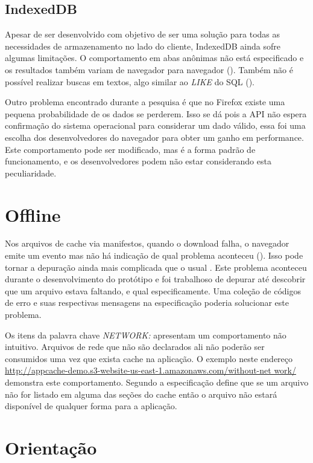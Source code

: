 \subsection{IndexedDB}

Apesar de ser desenvolvido com objetivo de ser uma solução para
todas as necessidades de armazenamento no lado do cliente, IndexedDB ainda
sofre algumas limitações. O comportamento em abas anônimas não
está especificado e os resultados também variam de navegador para
navegador (). Também não é
possível realizar buscas em textos, algo similar ao \textit{LIKE} do
SQL ().

Outro problema encontrado durante a pesquisa é que no Firefox existe
uma pequena probabilidade de os dados se perderem. Isso se dá pois a
API não espera confirmação do sistema operacional para considerar um
dado válido, essa foi uma escolha dos desenvolvedores do navegador para
obter um ganho em performance. Este comportamento pode ser modificado,
mas é a forma padrão de funcionamento, e os desenvolvedores podem não
estar considerando esta peculiaridade.

\section{Offline}

Nos arquivos de cache via manifestos, quando o download falha, o
navegador emite um evento mas não há indicação de qual problema
aconteceu (). Isso pode tornar a
depuração ainda mais complicada que o usual \autocite{diveIntohtml}.
Este problema aconteceu durante o desenvolvimento do protótipo e foi
trabalhoso de depurar até descobrir que um arquivo estava faltando,
e qual especificamente. Uma coleção de códigos de erro e suas
respectivas mensagens na especificação poderia solucionar este
problema.

Os itens da palavra chave \textit{NETWORK:} apresentam um
comportamento não intuitivo. Arquivos de rede que não
são declarados ali não poderão ser consumidos uma vez
que exista cache na aplicação. O exemplo neste endereço
\url{http://appcache-demo.s3-website-us-east-1.amazonaws.com/without-net
work/} demonstra este comportamento. Segundo \citet{gameAssetManagement}
a especificação define que se um arquivo não for listado em alguma
das seções do cache então o arquivo não estará disponível de
qualquer forma para a aplicação.

\section{Orientação}

